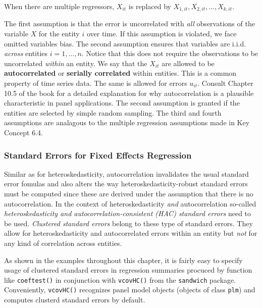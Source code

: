 \documentclass[]{book}
\theoremstyle{definition}
\theoremstyle{definition}
\theoremstyle{definition}
\theoremstyle{remark}
\begin{document}
When there are multiple regressors, \(X_{it}\) is replaced by
\(X_{1,it}, X_{2,it}, \dots, X_{k,it}\).

The first assumption is that the error is uncorrelated with \emph{all}
observations of the variable \(X\) for the entity \(i\) over time. If
this assumption is violated, we face omitted variables bias. The second
assumption ensures that variables are i.i.d. \emph{across} entities
\(i=1,\dots,n\). Notice that this does not require the observations to
be uncorrelated \emph{within} an entity. We say that the \(X_{it}\) are
allowed to be \textbf{autocorrelated} or \textbf{serially correlated}
within entities. This is a common property of time series data. The same
is allowed for errors \(u_{it}\). Consult Chapter 10.5 of the book for a
detailed explanation for why autocorrelation is a plausible
characteristic in panel applications. The second assumption is granted
if the entities are selected by simple random sampling. The third and
fourth assumptions are analagous to the multiple regression assumptions
made in Key Concept 6.4.

\subsubsection*{Standard Errors for Fixed Effects
Regression}\label{standard-errors-for-fixed-effects-regression}

Similar as for heteroskedasticity, autocorrelation invalidates the usual
standard error fomulas and also alters the way heteroskedasticity-robust
standard errors must be computed since these are derived under the
assumption that there is no autocorrelation. In the context of
heteroskedasticity \emph{and} autocorrelation so-called
\emph{heteroskedasticity and autocorrelation-consistent (HAC) standard
errors} need to be used. \emph{Clustered standard errors} belong to
these type of standard errors. They allow for heteroskedasticity and
autocorrelated errors within an entity but \emph{not} for any kind of
correlation across entities.

As shown in the examples throughout this chapter, it is fairly easy to
specify usage of clustered standard errors in regression summaries
procuced by function like \texttt{coeftest()} in conjunction with
\texttt{vcovHC()} from the \texttt{sandwich} package. Conveniently,
\texttt{vcovHC()} recognizes panel model objects (objects of class
\texttt{plm}) and computes clusterd standard errors by default.
\end{document}
